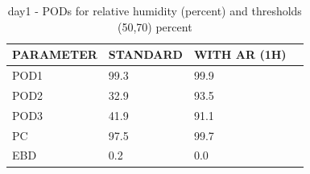 \begin{table}[p!]
\begin{center}
\begin{tabular}{|l|l|l|l|}
\hline
\multicolumn{1}{|c|}{\cellcolor[HTML]{C0C0C0}\textbf{PARAMETER}} & \multicolumn{1}{c|}{\cellcolor[HTML]{C0C0C0}\textbf{STANDARD}} & \multicolumn{1}{c|}{\cellcolor[HTML]{C0C0C0}\textbf{WITH AR (1H)}} \\
\hline
\cellcolor[HTML]{C0C0C0}POD1  & 99.3                                & 99.9         \\
\cellcolor[HTML]{C0C0C0}POD2  & 32.9                                & 93.5         \\
\cellcolor[HTML]{C0C0C0}POD3  & 41.9                                & 91.1         \\
\cellcolor[HTML]{C0C0C0}PC    & 97.5                                & 99.7           \\
\cellcolor[HTML]{C0C0C0}EBD   & 0.2                                & 0.0          \\
\hline
\end{tabular}
\caption{day1 - PODs for relative humidity (percent) and thresholds (50,70) percent}
\label{tab:podrhFT:day1}
\end{center}
\end{table}
